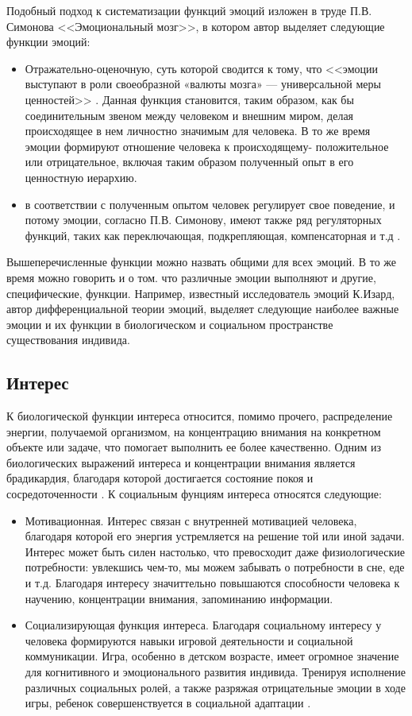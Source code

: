 \documentclass{../../common/thesisbyxetex}
\begin{document}
Подобный подход к систематизации функций эмоций изложен в труде П.В. Симонова <<Эмоциональный 
мозг>>, в котором автор выделяет следующие функции эмоций:
  \begin{itemize}
    \item Отражательно-оценочную, суть которой сводится к тому, что <<эмоции выступают в роли 
своеобразной «валюты мозга» — универсальной меры ценностей>> \cite[27]{sem}. Данная функция 
становится, таким образом, как бы соединительным звеном между человеком и внешним миром, делая 
происходящее в нем личностно значимым для человека. В то же время эмоции формируют отношение 
человека к происходящему- положительное или отрицательное, включая таким образом полученный опыт в 
его ценностную иерархию.
    \item в соответствии с полученным опытом человек регулирует свое поведение, и потому эмоции, 
согласно П.В. Симонову, имеют также ряд регуляторных функций, таких как 
переключающая, подкрепляющая, компенсаторная и т.д \cite{sem}.
\end{itemize}
  

Вышеперечисленные функции можно назвать общими для всех эмоций. В то же время можно говорить и о 
том. что различные эмоции выполняют и другие, специфические, функции.
Например, известный исследователь эмоций К.Изард, автор дифференциальной теории эмоций, выделяет 
следующие наиболее важные эмоции и их функции в биологическом и социальном пространстве 
существования индивида.

 \subsection*{Интерес}
 
 К биологической функции интереса относится, помимо прочего, распределение энергии, получаемой 
организмом, на концентрацию внимания на конкретном объекте или задаче, что помогает выполнить ее 
более качественно. Одним из биологических выражений интереса и концентрации внимания является 
брадикардия, благодаря которой достигается состояние покоя и сосредоточенности \cite[126]{izpsy}.
К социальным фунциям интереса относятся следующие:
\begin{itemize}
 \item Мотивационная. Интерес связан с внутренней мотивацией человека, благодаря которой его 
энергия устремляется на решение той или иной задачи. Интерес может быть силен настолько, что 
превосходит даже физиологические потребности: увлекшись чем-то, мы можем забывать о потребности в 
сне, еде и т.д. Благодаря интересу значиттельно повышаются способности человека к научению, 
концентрации внимания, запоминанию информации.
\item Социализирующая функция интереса. Благодаря социальному интересу у человека формируются 
навыки игровой деятельности и социальной коммуникации. Игра, особенно в детском возрасте, имеет 
огромное значение для когнитивного и эмоционального развития индивида. Тренируя исполнение 
различных социальных ролей, а также разряжая отрицательные эмоции в ходе игры, ребенок 
совершенствуется в социальной адаптации \cite{izpsy}.

\end{itemize}
\end{document}

